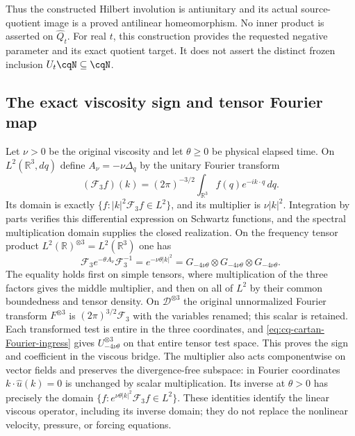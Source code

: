 Thus the constructed Hilbert involution is antiunitary and its
actual source-quotient image is a proved antilinear homeomorphism.
No inner product is asserted on $\widehat Q_t$.
For real $t$, this construction provides the requested negative
parameter and its exact quotient target. It does not assert
the distinct frozen inclusion $U_t\cqN\subseteq\cqN$.

\subsection{The exact viscosity sign and tensor Fourier map}

Let $\nu>0$ be the original viscosity and let $\theta\geq0$ be
physical elapsed time. On $L^2(\mathbb R^3,dq)$ define
$A_\nu=-\nu\Delta_q$ by the unitary Fourier transform
\[
 (\mathcal F_3f)(k)=(2\pi)^{-3/2}
                   \int_{\mathbb R^3}f(q)e^{-ik\cdot q}\,dq .
\]
Its domain is exactly
$\{f:|k|^2\mathcal F_3f\in L^2\}$, and its multiplier is
$\nu|k|^2$. Integration by parts verifies this differential
expression on Schwartz functions, and the spectral multiplication
domain supplies the closed realization. On the frequency tensor
product $L^2(\mathbb R)^{\otimes3}=L^2(\mathbb R^3)$ one has
\begin{equation}
 \mathcal F_3 e^{-\theta A_\nu}\mathcal F_3^{-1}
 =e^{-\nu\theta|k|^2}
 =G_{-4\nu\theta}\otimes G_{-4\nu\theta}\otimes G_{-4\nu\theta}.
 \label{eq:cq-viscosity-Fourier-intertwiner}
\end{equation}
The equality holds first on simple tensors, where multiplication
of the three factors gives the middle multiplier, and then on
all of $L^2$ by their common boundedness and tensor density.
On $\mathscr D^{\otimes3}$ the original unnormalized Fourier
transform $F^{\otimes3}$ is $(2\pi)^{3/2}\mathcal F_3$ with
the variables renamed; this scalar is retained. Each transformed
test is entire in the three coordinates, and
\eqref{eq:cq-cartan-Fourier-ingress} gives
$U_{-4\nu\theta}^{\otimes3}$ on that entire tensor test space.
This proves the sign and coefficient in the viscous bridge.
The multiplier also acts componentwise on vector fields and
preserves the divergence-free subspace: in Fourier coordinates
$k\cdot\widehat u(k)=0$ is unchanged by scalar multiplication.
Its inverse at $\theta>0$ has precisely the domain
$\{f:e^{\nu\theta|k|^2}\mathcal F_3f\in L^2\}$.
These identities identify the linear viscous operator, including
its inverse domain; they do not replace the nonlinear velocity,
pressure, or forcing equations.

